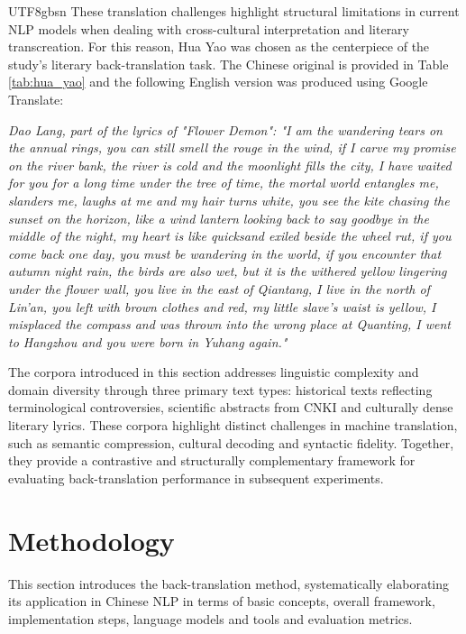 \documentclass[conference]{IEEEtran}
\begin{document}
\begin{CJK}{UTF8}{gbsn}
These translation challenges highlight structural limitations in current NLP models when dealing with cross-cultural interpretation and literary transcreation. For this reason, Hua Yao was chosen as the centerpiece of the study’s literary back-translation task. The Chinese original is provided in Table \ref{tab:hua_yao} and the following English version was produced using Google Translate:

\textit{Dao Lang, part of the lyrics of "Flower Demon": "I am the wandering tears on the annual rings, you can still smell the rouge in the wind, if I carve my promise on the river bank, the river is cold and the moonlight fills the city, I have waited for you for a long time under the tree of time, the mortal world entangles me, slanders me, laughs at me and my hair turns white, you see the kite chasing the sunset on the horizon, like a wind lantern looking back to say goodbye in the middle of the night, my heart is like quicksand exiled beside the wheel rut, if you come back one day, you must be wandering in the world, if you encounter that autumn night rain, the birds are also wet, but it is the withered yellow lingering under the flower wall, you live in the east of Qiantang, I live in the north of Lin'an, you left with brown clothes and red, my little slave's waist is yellow, I misplaced the compass and was thrown into the wrong place at Quanting, I went to Hangzhou and you were born in Yuhang again."}

The corpora introduced in this section addresses linguistic complexity and domain diversity through three primary text types: historical texts reflecting terminological controversies, scientific abstracts from CNKI and culturally dense literary lyrics. These corpora highlight distinct challenges in machine translation, such as semantic compression, cultural decoding and syntactic fidelity. Together, they provide a contrastive and structurally complementary framework for evaluating back-translation performance in subsequent experiments.

\section{Methodology}

This section introduces the back-translation method, systematically elaborating its application in Chinese NLP in terms of basic concepts, overall framework, implementation steps, language models and tools and evaluation metrics.


\end{CJK}
\end{document}
